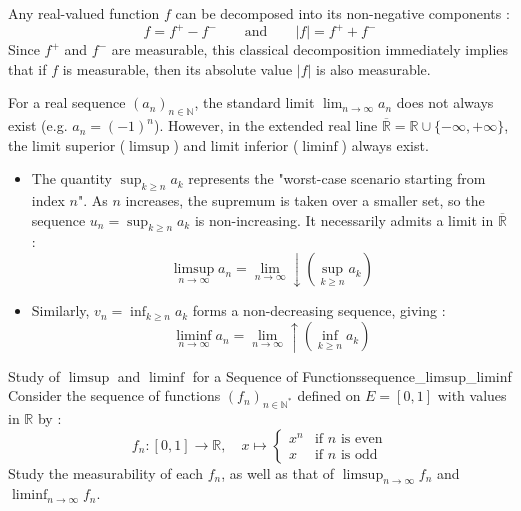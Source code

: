 \begin{insight}
Any real-valued function $f$ can be decomposed into its non-negative components :
\[
    f = f^+ - f^- \qquad \text{and} \qquad |f| = f^+ + f^-
\]
Since $f^+$ and $f^-$ are measurable, this classical decomposition immediately implies that if $f$ is measurable, then its absolute value $|f|$ is also measurable.
\end{insight}


\begin{insight}
For a real sequence $(a_n)_{n \in \mathbb{N}}$, the standard limit $\lim_{n \to \infty} a_n$ does not always exist (e.g. $a_n = (-1)^n$). However, in the extended real line $\overline{\mathbb{R}} = \mathbb{R} \cup \{-\infty, +\infty\}$, the limit superior ($\limsup$) and limit inferior ($\liminf$) always exist.

\begin{itemize}
    \item The quantity $\sup_{k \ge n} a_k$ represents the "worst-case scenario starting from index $n$". As $n$ increases, the supremum is taken over a smaller set, so the sequence $u_n = \sup_{k \ge n} a_k$ is non-increasing. It necessarily admits a limit in $\overline{\mathbb{R}}$ :
    \[
        \limsup_{n \to \infty} a_n = \lim_{n \to \infty} \downarrow \left( \sup_{k \ge n} a_k \right)
    \]
    \item Similarly, $v_n = \inf_{k \ge n} a_k$ forms a non-decreasing sequence, giving :
    \[
        \liminf_{n \to \infty} a_n = \lim_{n \to \infty} \uparrow \left( \inf_{k \ge n} a_k \right)
    \]
\end{itemize}
\end{insight}

\vspace{1.2em}


\begin{example}{Study of $\limsup$ and $\liminf$ for a Sequence of Functions}{sequence_limsup_liminf}
Consider the sequence of functions $(f_n)_{n \in \mathbb{N}^*}$ defined on $E = [0, 1]$ with values in $\mathbb{R}$ by :
\[
    f_n : [0, 1] \to \mathbb{R}, \quad x \mapsto 
    \begin{cases}
        x^n & \text{if } n \text{ is even} \\
        x & \text{if } n \text{ is odd}
    \end{cases}
\]
Study the measurability of each $f_n$, as well as that of $\limsup_{n \to \infty} f_n$ and $\liminf_{n \to \infty} f_n$.
\end{example}

